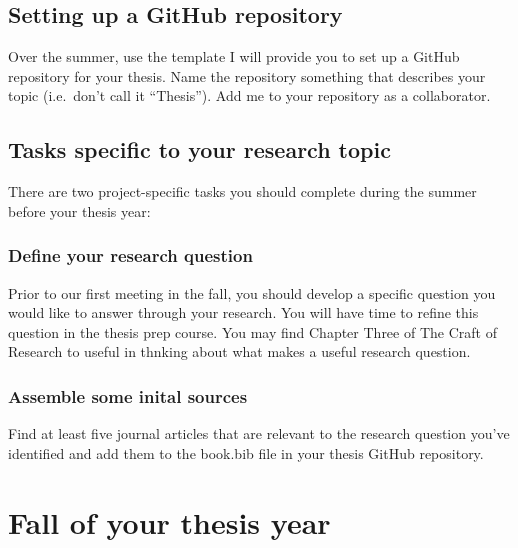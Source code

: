 \documentclass[
]{book}
\begin{document}
\hypertarget{setting-up-a-github-repository}{%
\subsection{Setting up a GitHub repository}\label{setting-up-a-github-repository}}

Over the summer, use the template I will provide you to set up a GitHub repository for your thesis. Name the repository something that describes your topic (i.e.~don't call it ``Thesis''). Add me to your repository as a collaborator.

\hypertarget{tasks-specific-to-your-research-topic}{%
\subsection{Tasks specific to your research topic}\label{tasks-specific-to-your-research-topic}}

There are two project-specific tasks you should complete during the summer before your thesis year:

\hypertarget{define-your-research-question}{%
\subsubsection{Define your research question}\label{define-your-research-question}}

Prior to our first meeting in the fall, you should develop a specific question you would like to answer through your research. You will have time to refine this question in the thesis prep course. You may find Chapter Three of The Craft of Research \citep{booth_chapter_2016} to useful in thnking about what makes a useful research question.

\hypertarget{assemble-some-inital-sources}{%
\subsubsection{Assemble some inital sources}\label{assemble-some-inital-sources}}

Find at least five journal articles that are relevant to the research question you've identified and add them to the book.bib file in your thesis GitHub repository.

\hypertarget{fall-of-your-thesis-year}{%
\section{Fall of your thesis year}\label{fall-of-your-thesis-year}}
\end{document}
